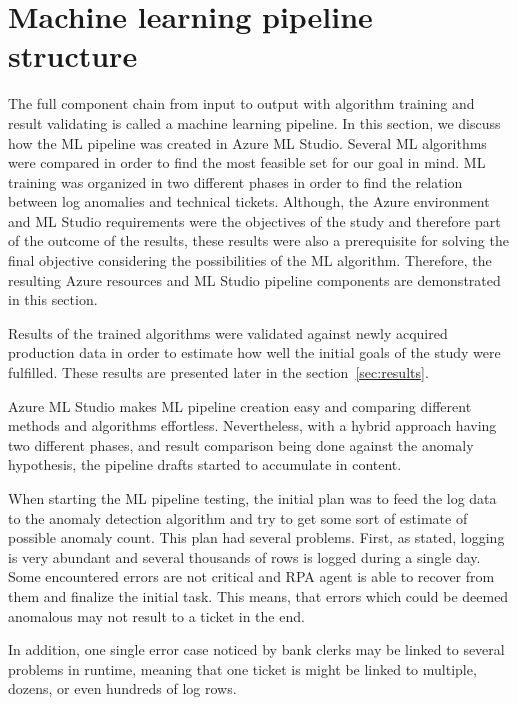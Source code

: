 

\section{Machine learning pipeline structure}\label{sec:ml-pipeline}

The full component chain from input to output
with algorithm training and result validating
is called a machine learning pipeline.
In this section,
we discuss how the ML pipeline was created in Azure ML Studio.
Several ML algorithms were compared
in order to find the most feasible set for our goal in mind.
ML training was organized in two different phases
in order to find the relation between
log anomalies and technical tickets.
Although, the Azure environment and ML Studio requirements
were the objectives of the study and therefore part of the outcome of the results,
these results were also a prerequisite for solving the final objective
considering the possibilities of the ML algorithm.
Therefore,
the resulting Azure resources and ML Studio pipeline components
are demonstrated in this section.

Results of the trained algorithms
were validated against newly acquired production data
in order to estimate how well the initial goals of the study
were fulfilled.
These results are presented later in the section~\ref{sec:results}.

Azure ML Studio makes ML pipeline creation easy
and comparing different methods and algorithms effortless.
Nevertheless,
with a hybrid approach having two different phases,
and result comparison being done against the anomaly hypothesis,
the pipeline drafts started to accumulate in content.

When starting the ML pipeline testing,
the initial plan was to feed the log data to the anomaly detection algorithm
and try to get some sort of estimate of possible anomaly count.
This plan had several problems.
First, as stated, logging is very abundant
and several thousands of rows is logged
during a single day.
Some encountered errors are not critical
and RPA agent is able to recover from them
and finalize the initial task.
This means,
that errors which could be deemed anomalous
may not result to a ticket in the end.

In addition,
one single error case noticed by bank clerks
may be linked to several problems in runtime,
meaning that one ticket is might be linked to multiple, dozens, or
even hundreds of log rows.

